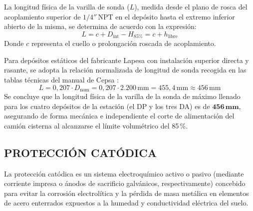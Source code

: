 \documentclass[12pt]{article}
\begin{document}
        La longitud física de la varilla de sonda ($L$), medida desde el plano de rosca del acoplamiento superior de $1/4''\,\text{NPT}$ en el depósito hasta el extremo inferior abierto de la misma, se determina de acuerdo con la expresión:
        \begin{equation}
            L = c + D_{\text{int}} - H_{85\%} = c + h_{\text{libre}}
        \end{equation}
        Donde $c$ representa el cuello o prolongación roscada de acoplamiento.

        Para depósitos estáticos del fabricante Lapesa \cite{lapesa} con instalación superior directa y rasante, se adopta la relación normalizada de longitud de sonda recogida en las tablas técnicas del manual de Cepsa \cite{cepsamanual}:
        \begin{equation}
            L = 0,207 \cdot D_{\text{nom}} = 0,207 \cdot 2.200\,\text{mm} = 455,4\,\text{mm} \approx 456\,\text{mm}
        \end{equation}
        Se concluye que la longitud física de la varilla de la sonda de máximo llenado para los cuatro depósitos de la estación (el DP y los tres DA) es de $\mathbf{456\,\text{mm}}$, asegurando de forma mecánica e independiente el corte de alimentación del camión cisterna al alcanzarse el límite volumétrico del 85\,\%.

        \subsection{PROTECCIÓN CATÓDICA}
        La protección catódica es un sistema electroquímico activo o pasivo (mediante corriente impresa o ánodos de sacrificio galvánicos, respectivamente) concebido para evitar la corrosión electrolítica y la pérdida de masa metálica en elementos de acero enterrados expuestos a la humedad y conductividad eléctrica del suelo.
\end{document}
